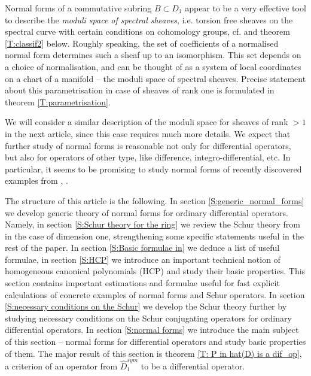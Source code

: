 \documentclass[11pt]{article}
\theoremstyle{definition}
\theoremstyle{plain}
\numberwithin{equation}{section}
\begin{document}
Normal forms of a commutative subring $B\subset D_1$ appear to be a very effective tool to describe the {\it moduli space of spectral sheaves}, i.e. torsion free sheaves on the spectral curve with certain conditions on cohomology groups, cf. \cite[\S 1.3]{BZ} and theorem \ref{T:classif2} below. Roughly speaking, the set of coefficients of a normalised normal form determines such a sheaf up to an isomorphism. This set depends on a choice of normalisation, and can be thought of as a system of local coordinates on a chart of a manifold -- the moduli space of spectral sheaves. Precise statement about this parametrisation in case of sheaves of rank one is formulated in theorem  \ref{T:parametrisation}. 



We will consider  a similar description of the moduli space for sheaves of rank $>1$ in the next article, since this case requires much more details. 
We expect that further study of normal forms is reasonable not only for differential operators, but also for operators of other type, like difference, integro-differential, etc. In particular, it seems to be promising  to study normal forms of recently discovered examples from \cite{MironovMaul}, \cite{MironovMaul1}.

\bigskip

The structure of this article is the following. In section \ref{S:generic_normal_forms} we develop generic theory of normal forms for ordinary differential operators. Namely, in section \ref{S:Schur theory for the ring}  we review the Schur theory from \cite{A.Z} in the case of dimension one, strengthening some specific statements useful in the rest of the paper. In section \ref{S:Basic  formulae in} we deduce a list of useful formulae, in section \ref{S:HCP} we introduce an important technical notion of homogeneous canonical polynomials (HCP) and study their basic properties. This section contains important estimations and formulae useful for fast explicit calculations of concrete examples of normal forms and Schur operators. In section \ref{S:necessary conditions on the Schur}  we develop the Schur theory further by studying necessary conditions on the Schur conjugating operators for ordinary differential operators. In section \ref{S:normal forms} we introduce the main subject of this section -- normal forms for differential operators and study basic properties of them. 
The major result of this section is theorem \ref{T: P in hat(D) is a dif_op}, a criterion of an operator from $\hat{D}_1^{sym}$ to be a differential operator. 
\end{document}
